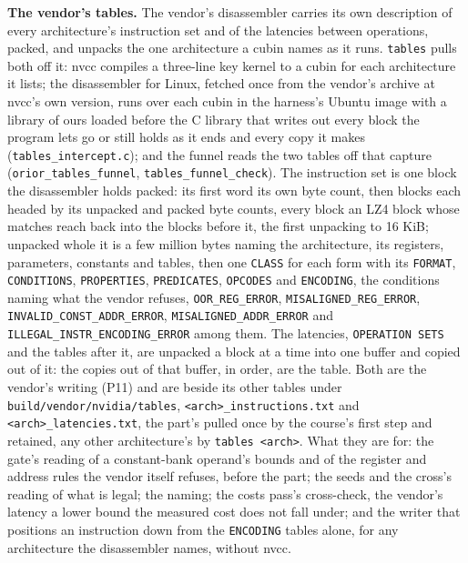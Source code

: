 \textbf{The vendor's tables.} The vendor's disassembler carries its own description of every architecture's instruction set and of the latencies between operations, packed, and unpacks the one architecture a cubin names as it runs. \texttt{tables} pulls both off it: nvcc compiles a three-line key kernel to a cubin for each architecture it lists; the disassembler for Linux, fetched once from the vendor's archive at nvcc's own version, runs over each cubin in the harness's Ubuntu image with a library of ours loaded before the C library that writes out every block the program lets go or still holds as it ends and every copy it makes (\texttt{tables\_\allowbreak{}intercept.\allowbreak{}c}); and the funnel reads the two tables off that capture (\texttt{orior\_\allowbreak{}tables\_\allowbreak{}funnel}, \texttt{tables\_\allowbreak{}funnel\_\allowbreak{}check}). The instruction set is one block the disassembler holds packed: its first word its own byte count, then blocks each headed by its unpacked and packed byte counts, every block an LZ4 block whose matches reach back into the blocks before it, the first unpacking to 16 KiB; unpacked whole it is a few million bytes naming the architecture, its registers, parameters, constants and tables, then one \texttt{CLASS} for each form with its \texttt{FORMAT}, \texttt{CONDITIONS}, \texttt{PROPERTIES}, \texttt{PREDICATES}, \texttt{OPCODES} and \texttt{ENCODING}, the conditions naming what the vendor refuses, \texttt{OOR\_\allowbreak{}REG\_\allowbreak{}ERROR}, \texttt{MISALIGNED\_\allowbreak{}REG\_\allowbreak{}ERROR}, \texttt{INVALID\_\allowbreak{}CONST\_\allowbreak{}ADDR\_\allowbreak{}ERROR}, \texttt{MISALIGNED\_\allowbreak{}ADDR\_\allowbreak{}ERROR} and \texttt{ILLEGAL\_\allowbreak{}INSTR\_\allowbreak{}ENCODING\_\allowbreak{}ERROR} among them. The latencies, \texttt{OPERATION SETS} and the tables after it, are unpacked a block at a time into one buffer and copied out of it: the copies out of that buffer, in order, are the table. Both are the vendor's writing (P11) and are beside its other tables under \texttt{build/\allowbreak{}vendor/\allowbreak{}nvidia/\allowbreak{}tables}, \texttt{<arch>\_\allowbreak{}instructions.\allowbreak{}txt} and \texttt{<arch>\_\allowbreak{}latencies.\allowbreak{}txt}, the part's pulled once by the course's first step and retained, any other architecture's by \texttt{tables <arch>}. What they are for: the gate's reading of a constant-bank operand's bounds and of the register and address rules the vendor itself refuses, before the part; the seeds and the cross's reading of what is legal; the naming; the costs pass's cross-check, the vendor's latency a lower bound the measured cost does not fall under; and the writer that positions an instruction down from the \texttt{ENCODING} tables alone, for any architecture the disassembler names, without nvcc.

